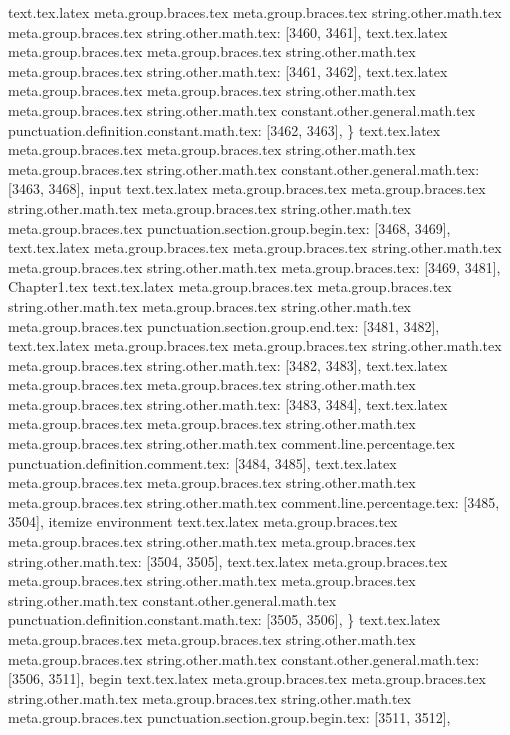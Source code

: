 {{{{{{{{{{{{{{{{{{{{{{{{{{{{{{{{{{{{{{{{{{{{{{{{{{{{{{{{{{{{{{{{{{{{{{{{{{{{{{{{{{{{{{{{{{{{{{{{{{{{{{{{text.tex.latex meta.group.braces.tex meta.group.braces.tex string.other.math.tex meta.group.braces.tex string.other.math.tex: [3460, 3461], {
}
text.tex.latex meta.group.braces.tex meta.group.braces.tex string.other.math.tex meta.group.braces.tex string.other.math.tex: [3461, 3462], {
}
text.tex.latex meta.group.braces.tex meta.group.braces.tex string.other.math.tex meta.group.braces.tex string.other.math.tex constant.other.general.math.tex punctuation.definition.constant.math.tex: [3462, 3463], {\}
text.tex.latex meta.group.braces.tex meta.group.braces.tex string.other.math.tex meta.group.braces.tex string.other.math.tex constant.other.general.math.tex: [3463, 3468], {input}
text.tex.latex meta.group.braces.tex meta.group.braces.tex string.other.math.tex meta.group.braces.tex string.other.math.tex meta.group.braces.tex punctuation.section.group.begin.tex: [3468, 3469], {{}
text.tex.latex meta.group.braces.tex meta.group.braces.tex string.other.math.tex meta.group.braces.tex string.other.math.tex meta.group.braces.tex: [3469, 3481], {Chapter1.tex}
text.tex.latex meta.group.braces.tex meta.group.braces.tex string.other.math.tex meta.group.braces.tex string.other.math.tex meta.group.braces.tex punctuation.section.group.end.tex: [3481, 3482], {}}
text.tex.latex meta.group.braces.tex meta.group.braces.tex string.other.math.tex meta.group.braces.tex string.other.math.tex: [3482, 3483], {
}
text.tex.latex meta.group.braces.tex meta.group.braces.tex string.other.math.tex meta.group.braces.tex string.other.math.tex: [3483, 3484], {
}
text.tex.latex meta.group.braces.tex meta.group.braces.tex string.other.math.tex meta.group.braces.tex string.other.math.tex comment.line.percentage.tex punctuation.definition.comment.tex: [3484, 3485], {%
text.tex.latex meta.group.braces.tex meta.group.braces.tex string.other.math.tex meta.group.braces.tex string.other.math.tex comment.line.percentage.tex: [3485, 3504], {itemize environment}
text.tex.latex meta.group.braces.tex meta.group.braces.tex string.other.math.tex meta.group.braces.tex string.other.math.tex: [3504, 3505], {
}
text.tex.latex meta.group.braces.tex meta.group.braces.tex string.other.math.tex meta.group.braces.tex string.other.math.tex constant.other.general.math.tex punctuation.definition.constant.math.tex: [3505, 3506], {\}
text.tex.latex meta.group.braces.tex meta.group.braces.tex string.other.math.tex meta.group.braces.tex string.other.math.tex constant.other.general.math.tex: [3506, 3511], {begin}
text.tex.latex meta.group.braces.tex meta.group.braces.tex string.other.math.tex meta.group.braces.tex string.other.math.tex meta.group.braces.tex punctuation.section.group.begin.tex: [3511, 3512], {{}
}}}}}}}}}}}}}}}}}}}}}}}}}}}}}}}}}}}}}}}}}}}}}}}}}}}}}}}}}}}}}}}}}}}}}}}}}}}}}}}}}}}}}}}}}}}}}}}}}}}}}}}}}}}}
